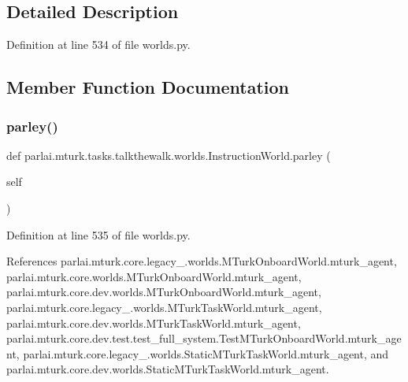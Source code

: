 \subsection{Detailed Description}


Definition at line 534 of file worlds.\+py.



\subsection{Member Function Documentation}
\mbox{\label{classparlai_1_1mturk_1_1tasks_1_1talkthewalk_1_1worlds_1_1InstructionWorld_a06b05ffcdf06af461c8f0d7b916d0d45}} 
\subsubsection{\texorpdfstring{parley()}{parley()}}
{\footnotesize\ttfamily def parlai.\+mturk.\+tasks.\+talkthewalk.\+worlds.\+Instruction\+World.\+parley (\begin{DoxyParamCaption}\item[{}]{self }\end{DoxyParamCaption})}



Definition at line 535 of file worlds.\+py.



References parlai.\+mturk.\+core.\+legacy\+\_.\+worlds.\+M\+Turk\+Onboard\+World.\+mturk\+\_\+agent, parlai.\+mturk.\+core.\+worlds.\+M\+Turk\+Onboard\+World.\+mturk\+\_\+agent, parlai.\+mturk.\+core.\+dev.\+worlds.\+M\+Turk\+Onboard\+World.\+mturk\+\_\+agent, parlai.\+mturk.\+core.\+legacy\+\_.\+worlds.\+M\+Turk\+Task\+World.\+mturk\+\_\+agent, parlai.\+mturk.\+core.\+dev.\+worlds.\+M\+Turk\+Task\+World.\+mturk\+\_\+agent, parlai.\+mturk.\+core.\+dev.\+test.\+test\+\_\+full\+\_\+system.\+Test\+M\+Turk\+Onboard\+World.\+mturk\+\_\+agent, parlai.\+mturk.\+core.\+legacy\+\_.\+worlds.\+Static\+M\+Turk\+Task\+World.\+mturk\+\_\+agent, and parlai.\+mturk.\+core.\+dev.\+worlds.\+Static\+M\+Turk\+Task\+World.\+mturk\+\_\+agent.



